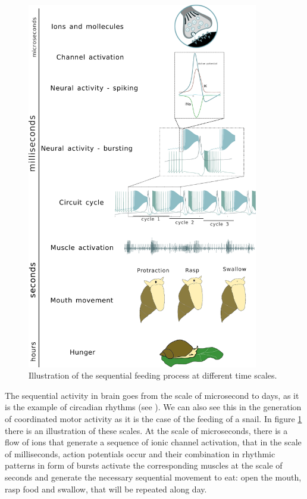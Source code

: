 \begin{figure}[hbt!]
	\centering
	\includegraphics[width=0.9\textwidth]{img/intro/time scale/time-scale-feeding.pdf}
	\caption{Illustration of the sequential feeding process at different time scales.}
	\label{fig:time scale feeding}
\end{figure}

The sequential activity in brain goes from the scale of microsecond to days, as it is the example of circadian rhythms (see \cite{mauk_neural_2004}). We can also see this in the generation of coordinated motor activity as it is the case of the feeding of a snail. In figure \ref{fig:time scale feeding} there is an illustration of these scales. At the scale of microseconds, there is a flow of ions that generate a sequence of ionic channel activation, that in the scale of milliseconds, action potentials occur and their combination in rhythmic patterns in form of bursts activate the corresponding muscles at the scale of seconds  and generate the necessary sequential movement to eat: open the mouth, rasp food and swallow, that will be repeated along day. 

